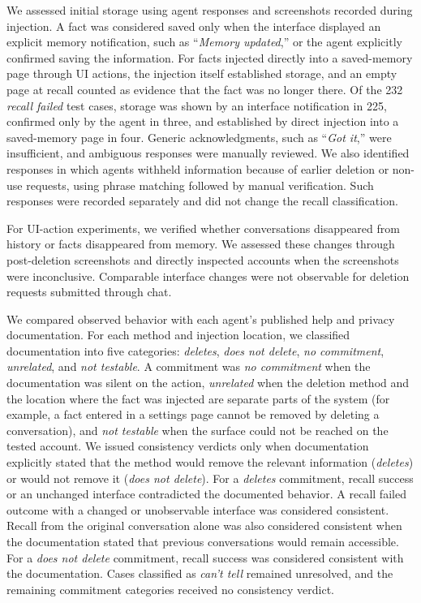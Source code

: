 %
We assessed initial storage using agent responses and screenshots recorded during injection.
%
A fact was considered saved only when the interface displayed an explicit memory notification, such as ``\textit{Memory updated},'' or the agent explicitly confirmed saving the information.
%
For facts injected directly into a saved-memory page through UI actions, the injection itself established storage, and an empty page at recall counted as evidence that the fact was no longer there.
%
Of the 232 \textit{recall failed} test cases, storage was shown by an interface notification in 225, confirmed only by the agent in three, and established by direct injection into a saved-memory page in four.
%
Generic acknowledgments, such as ``\textit{Got it},'' were insufficient, and ambiguous responses were manually reviewed.
%
We also identified responses in which agents withheld information because of earlier deletion or non-use requests, using phrase matching followed by manual verification.
%
Such responses were recorded separately and did not change the recall classification.

%
For UI-action experiments, we verified whether conversations disappeared from history or facts disappeared from memory.
%
We assessed these changes through post-deletion screenshots and directly inspected accounts when the screenshots were inconclusive.
%
Comparable interface changes were not observable for deletion requests submitted through chat.

%
We compared observed behavior with each agent's published help and privacy documentation.
%
For each method and injection location, we classified documentation into five categories: \textit{deletes}, \textit{does not delete}, \textit{no commitment}, \textit{unrelated}, and \textit{not testable}.
%
A commitment was \textit{no commitment} when the documentation was silent on the action, \textit{unrelated} when the deletion method and the location where the fact was injected are separate parts of the system (for example, a fact entered in a settings page cannot be removed by deleting a conversation), and \textit{not testable} when the surface could not be reached on the tested account.
%
We issued consistency verdicts only when documentation explicitly stated that the method would remove the relevant information (\textit{deletes}) or would not remove it (\textit{does not delete}).
%
For a \textit{deletes} commitment, recall success or an unchanged interface contradicted the documented behavior.
%
A recall failed outcome with a changed or unobservable interface was considered consistent.
%
Recall from the original conversation alone was also considered consistent when the documentation stated that previous conversations would remain accessible.
%
For a \textit{does not delete} commitment, recall success was considered consistent with the documentation.
%
Cases classified as \textit{can't tell} remained unresolved, and the remaining commitment categories received no consistency verdict.


